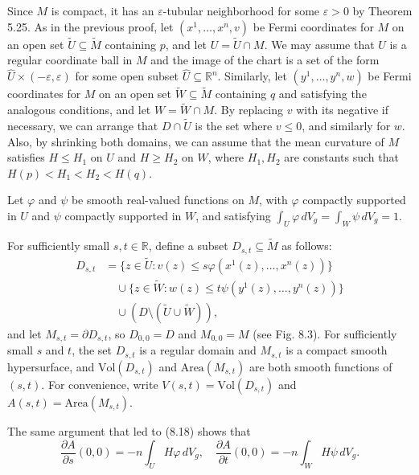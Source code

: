 Since $M$ is compact, it has an $\varepsilon$-tubular neighborhood for some $\varepsilon > 0$ by Theorem 5.25. As in the previous proof, let $(x^1,\ldots,x^n,v)$ be Fermi coordinates for $M$ on an open set $\tilde{U} \subseteq \tilde{M}$ containing $p$, and let $U = \tilde{U} \cap M$. We may assume that $U$ is a regular coordinate ball in $M$ and the image of the chart is a set of the form $\hat{U} \times (-\varepsilon,\varepsilon)$ for some open subset $\hat{U} \subseteq \mathbb{R}^n$. Similarly, let $(y^1,\ldots,y^n,w)$ be Fermi coordinates for $M$ on an open set $\tilde{W} \subseteq \tilde{M}$ containing $q$ and satisfying the analogous conditions, and let $W = \tilde{W} \cap M$. By replacing $v$ with its negative if necessary, we can arrange that $D \cap \tilde{U}$ is the set where $v \le 0$, and similarly for $w$. Also, by shrinking both domains, we can assume that the mean curvature of $M$ satisfies $H \le H_1$ on $U$ and $H \ge H_2$ on $W$, where $H_1, H_2$ are constants such that $H(p) < H_1 < H_2 < H(q)$.

Let $\varphi$ and $\psi$ be smooth real-valued functions on $M$, with $\varphi$ compactly supported in $U$ and $\psi$ compactly supported in $W$, and satisfying $\int_U \varphi \, dV_g = \int_W \psi \, dV_g = 1$.

For sufficiently small $s,t \in \mathbb{R}$, define a subset $D_{s,t} \subseteq \tilde{M}$ as follows:
\begin{align*}
D_{s,t} &= \{z \in \tilde{U} : v(z) \le s\varphi(x^1(z),\ldots,x^n(z))\} \\
&\quad \cup \{z \in \tilde{W} : w(z) \le t\psi(y^1(z),\ldots,y^n(z))\} \\
&\quad \cup \left(D \setminus (\tilde{U} \cup \tilde{W})\right),
\end{align*}
and let $M_{s,t} = \partial D_{s,t}$, so $D_{0,0} = D$ and $M_{0,0} = M$ (see Fig. 8.3). For sufficiently small $s$ and $t$, the set $D_{s,t}$ is a regular domain and $M_{s,t}$ is a compact smooth hypersurface, and $\text{Vol}(D_{s,t})$ and $\text{Area}(M_{s,t})$ are both smooth functions of $(s,t)$. For convenience, write $V(s,t) = \text{Vol}(D_{s,t})$ and $A(s,t) = \text{Area}(M_{s,t})$.

The same argument that led to (8.18) shows that
\[
\frac{\partial A}{\partial s}(0,0) = -n \int_U H\varphi \, dV_g, \quad \frac{\partial A}{\partial t}(0,0) = -n \int_W H\psi \, dV_g.
\]


